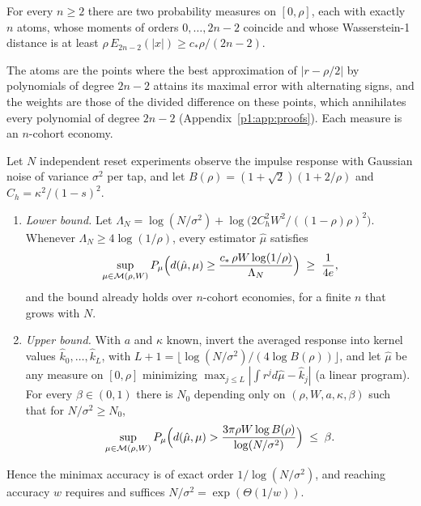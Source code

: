 \begin{lemma}\label{p1:lem:altpair}
For every $n\ge2$ there are two probability measures on $[0,\rho]$, each with exactly $n$ atoms, whose moments of orders $0,\ldots,2n-2$ coincide and whose Wasserstein-1 distance is at least $\rho\,E_{2n-2}(|x|)\ge c_*\rho/(2n-2)$.
\end{lemma}

The atoms are the points where the best approximation of $|r-\rho/2|$ by polynomials of degree $2n-2$ attains its maximal error with alternating signs, and the weights are those of the divided difference on these points, which annihilates every polynomial of degree $2n-2$ (Appendix~\ref{p1:app:proofs}). Each measure is an $n$-cohort economy.

\begin{theorem}\label{p1:thm:general}
Let $N$ independent reset experiments observe the impulse response with Gaussian noise of variance $\sigma^2$ per tap, and let $B(\rho)=(1+\sqrt2)(1+2/\rho)$ and $C_h=\kappa^2/(1-s)^2$.
\begin{enumerate}[label=(\roman*)]
\item \emph{Lower bound.} Let $\Lambda_N=\log(N/\sigma^2)+\log\bigl(2C_h^2W^2/((1-\rho)\rho)^2\bigr)$. Whenever $\Lambda_N\ge4\log(1/\rho)$, every estimator $\hat\mu$ satisfies
\[
\sup_{\mu\in\mathcal M(\rho,W)}P_\mu\Bigl(d(\hat\mu,\mu)\ge\frac{c_*\,\rho W\log(1/\rho)}{\Lambda_N}\Bigr)\;\ge\;\frac1{4e},
\]
and the bound already holds over $n$-cohort economies, for a finite $n$ that grows with $N$.
\item \emph{Upper bound.} With $a$ and $\kappa$ known, invert the averaged response into kernel values $\hat k_0,\ldots,\hat k_L$, with $L+1=\lfloor\log(N/\sigma^2)/(4\log B(\rho))\rfloor$, and let $\hat\mu$ be any measure on $[0,\rho]$ minimizing $\max_{j\le L}|\int r^jd\hat\mu-\hat k_j|$ (a linear program). For every $\beta\in(0,1)$ there is $N_0$ depending only on $(\rho,W,a,\kappa,\beta)$ such that for $N/\sigma^2\ge N_0$,
\[
\sup_{\mu\in\mathcal M(\rho,W)}P_\mu\Bigl(d(\hat\mu,\mu)>\frac{3\pi\rho W\log B(\rho)}{\log(N/\sigma^2)}\Bigr)\;\le\;\beta .
\]
\end{enumerate}
Hence the minimax accuracy is of exact order $1/\log(N/\sigma^2)$, and reaching accuracy $w$ requires and suffices $N/\sigma^2=\exp(\Theta(1/w))$.
\end{theorem}


